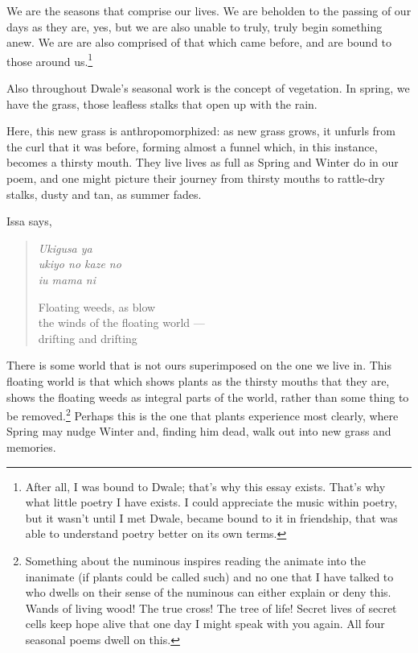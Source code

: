 \documentclass[12pt,oneside]{memoir}
\begin{document}
We are the seasons that comprise our lives. We are beholden to the passing of our days as they are, yes, but we are also unable to truly, truly begin something anew. We are are also comprised of that which came before, and are bound to those around us.\footnote{After all, I was bound to Dwale; that's why this essay exists. That's why what little poetry I have exists. I could appreciate the music within poetry, but it wasn't until I met Dwale, became bound to it in friendship, that was able to understand poetry better on its own terms.}

Also throughout Dwale's seasonal work is the concept of vegetation. In spring, we have the grass, those leafless stalks that open up with the rain.

Here, this new grass is anthropomorphized: as new grass grows, it unfurls from the curl that it was before, forming almost a funnel which, in this instance, becomes a thirsty mouth. They live lives as full as Spring and Winter do in our poem, and one might picture their journey from thirsty mouths to rattle-dry stalks, dusty and tan, as summer fades.

Issa says,

\begin{verse}
\begin{multicols}{2}
\emph{Ukigusa ya} \\
\emph{ukiyo no kaze no} \\
\emph{iu mama ni}

\columnbreak

Floating weeds, as blow \\
the winds of the floating world --- \\
drifting and drifting
\end{multicols}
\parencite[18]{issa}
\end{verse}

There is some world that is not ours superimposed on the one we live in. This floating world is that which shows plants as the thirsty mouths that they are, shows the floating weeds as integral parts of the world, rather than some thing to be removed.\footnote{Something about the numinous inspires reading the animate into the inanimate (if plants could be called such) and no one that I have talked to who dwells on their sense of the numinous can either explain or deny this. Wands of living wood! The true cross! The tree of life! Secret lives of secret cells keep hope alive that one day I might speak with you again. All four seasonal poems dwell on this.} Perhaps this is the one that plants experience most clearly, where Spring may nudge Winter and, finding him dead, walk out into new grass and memories.
\end{document}
